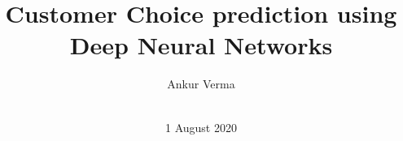 

  \title{Customer Choice prediction using Deep Neural Networks}
  \author{
    \alignauthor
      Ankur Verma\\
      \\
}
\date{1 August 2020}
\maketitle





